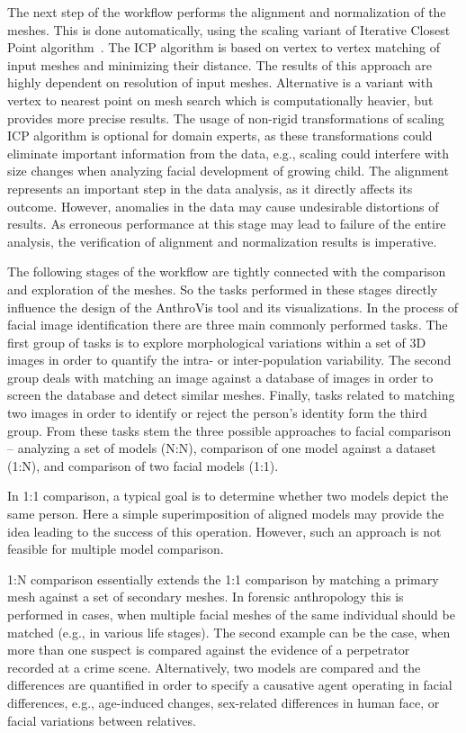\documentclass[final,5p,times]{elsarticle}
\begin{document}
The next step of the workflow performs the alignment and normalization of the meshes. 
This is done automatically, using the scaling variant of Iterative Closest Point algorithm~\cite{besl1992method, du2010scaling}. 
The ICP algorithm is based on vertex to vertex matching of input meshes and  minimizing their distance.
The results of this approach are highly dependent on resolution of input meshes.
Alternative is a variant with vertex to nearest point on mesh search which is computationally heavier, but provides more precise results.
The usage of non-rigid transformations of scaling ICP algorithm is optional for domain experts, as these transformations could eliminate important information from the data, e.g., scaling could interfere with size changes when analyzing facial development of growing child.
The alignment represents an important step in the data analysis, as it directly affects its outcome.
However, anomalies in the data may cause undesirable distortions of results. 
As erroneous performance at this stage may lead to failure of the entire analysis, the verification of alignment and normalization results is imperative.

The following stages of the workflow are tightly connected with the comparison and exploration of the meshes.
So the tasks performed in these stages directly influence the design of the AnthroVis tool and its visualizations.
In the process of facial image identification there are three main commonly performed tasks.
The first group of tasks is to explore morphological variations within a set of 3D images in order to quantify the intra- or inter-population variability.
The second group deals with matching an image against a database of images in order to screen the database and detect similar meshes.
Finally, tasks related to matching two images in order to identify or reject the person's identity form the third group.
From these tasks stem the three possible approaches to facial comparison -- analyzing a set of models (N:N), comparison of one model against a dataset (1:N), and comparison of two facial models (1:1). 

In 1:1 comparison, a typical goal is to determine whether two models depict the same person. 
Here a simple superimposition of aligned models may provide the idea leading to the success of this operation.
However, such an approach is not feasible for multiple model comparison.

1:N comparison essentially extends the 1:1 comparison by matching a primary mesh against a set of secondary meshes. 
In forensic anthropology this is performed in cases, when multiple facial meshes of the same individual should be matched (e.g., in various life stages).
The second example can be the case, when more than one suspect is compared against the evidence of a perpetrator recorded at a crime scene. 
Alternatively, two models are compared and the differences are quantified in order to specify a causative agent operating in facial differences, e.g., age-induced changes, sex-related differences in human face, or facial variations between relatives.
\end{document}
